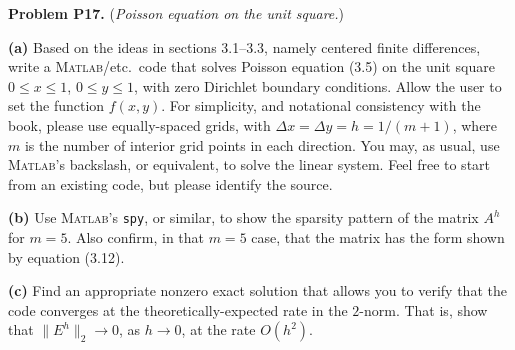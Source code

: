 \documentclass[12pt]{amsart}
\newcommand{\Matlab}{\textsc{Matlab}\xspace}
\newcommand{\prob}[1]{\bigskip\noindent\textbf{#1}\quad }
\newcommand{\epart}[1]{\medskip\noindent\textbf{(#1)}\quad }
\begin{document}
\prob{Problem P17.}  (\emph{Poisson equation on the unit square.})

\epart{a}  Based on the ideas in sections 3.1--3.3, namely centered finite differences, write a \Matlab/etc.~code that solves Poisson equation (3.5) on the unit square $0\le x \le 1$, $0 \le y \le 1$, with zero Dirichlet boundary conditions.  Allow the user to set the function $f(x,y)$.  For simplicity, and notational consistency with the book, please use equally-spaced grids, with $\Delta x = \Delta y = h = 1 / (m+1)$, where $m$ is the number of interior grid points in each direction.  You may, as usual, use \Matlab's backslash, or equivalent, to solve the linear system.  Feel free to start from an existing code, but please identify the source.

\epart{b}  Use \Matlab's \texttt{spy}, or similar, to show the sparsity pattern of the matrix $A^h$ for $m=5$.  Also confirm, in that $m=5$ case, that the matrix has the form shown by equation (3.12).

\epart{c}  Find an appropriate nonzero exact solution that allows you to verify that the code converges at the theoretically-expected rate in the $2$-norm.  That is, show that $\|E^h\|_2 \to 0$, as $h\to 0$, at the rate $O(h^2)$.
\end{document}
